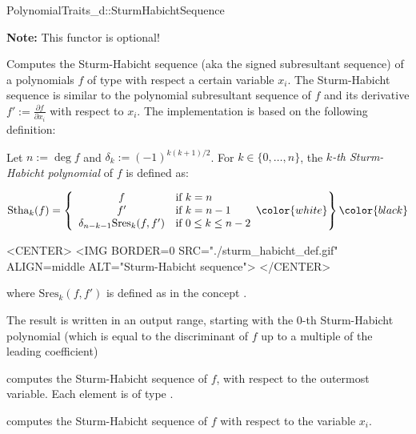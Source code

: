 \begin{ccRefConcept}{PolynomialTraits_d::SturmHabichtSequence}

\textbf{Note:} This functor is optional!

\ccDefinition

Computes the Sturm-Habicht sequence 
(aka the signed subresultant sequence)
of a polynomials $f$ of type 
 with respect a certain variable $x_i$.
The Sturm-Habicht sequence is similar to the polynomial subresultant sequence
of $f$ and its derivative $f':=\frac{\partial f}{\partial x_i}$
with respect to $x_i$. The implementation is based on the following definition:

Let $n:=\deg f$ and $\delta_k:=(-1)^{k(k+1)/2}$. 
For $k\in\{0,\ldots,n\}$, the {\it $k$-th Sturm-Habicht polynomial} 
of $f$ is defined as:

\begin{ccTexOnly}
$$\mathrm{Stha}_k(f)=\left\{\begin{array}{cl}
f & \textrm{if\ } k=n\\
f' & \textrm{if\ } k=n-1\\
\delta_{n-k-1}\mathrm{Sres}_k(f,f') &\textrm{if\ } 0\leq k\leq n-2
\end{array}\color{white}\right\}\color{black}$$
\end{ccTexOnly}

\begin{ccHtmlOnly}
<CENTER>
<IMG BORDER=0 SRC="./sturm_habicht_def.gif" ALIGN=middle ALT="Sturm-Habicht sequence">
</CENTER>
\end{ccHtmlOnly}

where $\mathrm{Sres}_k(f,f')$ is defined 
as in the concept .

The result is written in an output range, 
starting with the $0$-th Sturm-Habicht polynomial (which is equal to
the discriminant of $f$ up to a multiple of the leading coefficient)

\ccOperations
{}
         { computes the Sturm-Habicht sequence of $f$, 
           with respect to the outermost variable. Each element is of type
           .}

         { computes the Sturm-Habicht sequence of $f$ 
           with respect to the variable $x_i$.}


\ccSeeAlso

\\
\\

\end{ccRefConcept}
